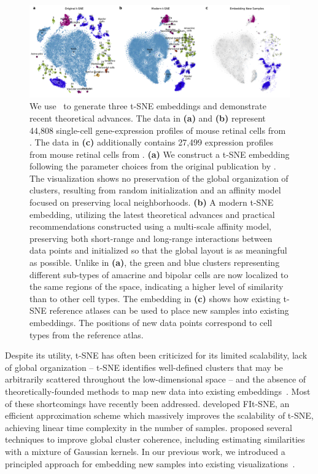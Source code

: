 \documentclass[article]{jss}
\newcommand{\opentsne}{\pkg{openTSNE}}
\begin{document}
\begin{figure}[ht]
  \includegraphics[width=\textwidth]{macosko2015}
  \caption{\label{fig:macosko}
  We use \opentsne\ to generate three t-SNE embeddings and demonstrate recent
  theoretical advances. The data in \textbf{(a)} and \textbf{(b)} represent
  44,808 single-cell gene-expression profiles of mouse retinal cells from 
  \citet{macosko2015highly}. The data in \textbf{(c)} additionally contains
  27,499 expression profiles from mouse retinal cells from
  \citet{shekhar2016comprehensive}. \textbf{(a)} We construct a t-SNE embedding
  following the parameter choices from the original publication by
  \citet{maaten2008visualizing}. The visualization shows no preservation of the
  global organization of clusters, resulting from random initialization and an
  affinity model focused on preserving local neighborhoods. \textbf{(b)} A
  modern t-SNE embedding, utilizing the latest theoretical advances and
  practical recommendations constructed using a multi-scale affinity model,
  preserving both short-range and long-range interactions between data points
  and initialized so that the global layout is as meaningful as possible. Unlike
  in \textbf{(a)}, the green and blue clusters representing different sub-types
  of amacrine and bipolar cells are now localized to the same regions of the
  space, indicating a higher level of similarity than to other cell types. The
  embedding in \textbf{(c)} shows how existing t-SNE reference atlases can be
  used to place new samples into existing embeddings. The positions of new data
  points correspond to cell types from the reference atlas.
}
\end{figure}

Despite its utility, t-SNE has often been criticized for its limited
scalability, lack of global organization -- t-SNE identifies well-defined
clusters that may be arbitrarily scattered throughout the low-dimensional space
-- and the absence of theoretically-founded methods to map new data into
existing embeddings~\citep{ding2018interpretable,becht2019dimensionality}. Most
of these shortcomings have recently been addressed. \citet{linderman2019fast}
developed FIt-SNE, an efficient approximation scheme which massively improves
the scalability of t-SNE, achieving linear time complexity in the number of
samples. \citet{kobak2019art} proposed several techniques to improve global
cluster coherence, including estimating similarities with a mixture of Gaussian
kernels. In our previous work, we introduced a principled approach for embedding
new samples into existing visualizations~\citep{policar2019embedding}.
\end{document}
